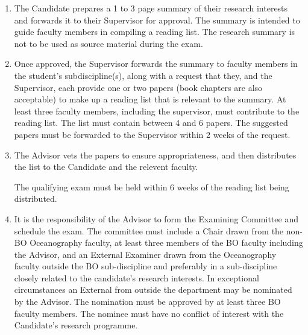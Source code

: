 \begin{enumerate}

    \item The Candidate prepares a 1 to 3 page summary of their
        research interests and forwards it to their Supervisor for approval.
        The summary is intended to guide faculty members in compiling a reading
        list.  The research summary is not to be used as source material during
        the exam.

    \item Once approved, the Supervisor forwards the summary to faculty members
        in the student's subdiscipline(s), along with a request that
        they, and the Supervisor, each provide one or two papers (book chapters
        are also acceptable) to make up a reading list that is relevant to the
        summary. At least three faculty members, including the supervisor, must
        contribute to the reading list. The list must contain between 4 and 6
        papers. The suggested papers must be forwarded to the
        Supervisor within 2 weeks of the request.

    \item The Advisor vets the papers to ensure appropriateness, and then
        distributes the list to the Candidate and the relevent
        faculty.
        
            
            The qualifying exam must be held within 6 weeks of the reading list
            being distributed. 

\item It is the responsibility of the Advisor to form the Examining Committee and schedule the exam. The committee must include a Chair drawn from the non-BO Oceanography faculty, at least three members of the BO faculty including the Advisor, and an External Examiner drawn from the Oceanography faculty outside the BO sub-discipline and preferably in a sub-discipline closely related to the candidate’s research interests. In exceptional circumstances an External from outside the department may be nominated by the Advisor. The nomination must be approved by at least three BO faculty members. The nominee must have no conflict of interest with the Candidate’s research programme. 


\end{enumerate}
